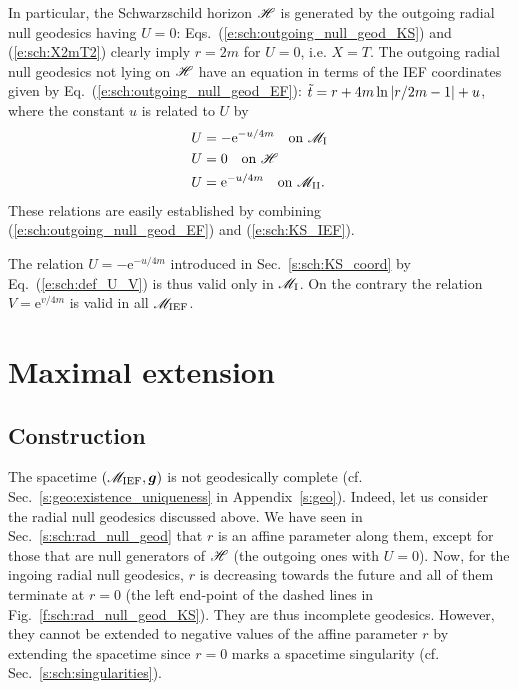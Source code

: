 In particular, the Schwarzschild horizon $\mathscr{H}$ is generated by the
outgoing radial null geodesics having $U=0$:
Eqs.~(\ref{e:sch:outgoing_null_geod_KS}) and (\ref{e:sch:X2mT2})
clearly imply $r=2m$ for $U=0$, i.e. $X=T$.
 The outgoing radial null geodesics not lying on $\mathscr{H}$ have an equation
in terms of the IEF coordinates given by
Eq.~(\ref{e:sch:outgoing_null_geod_EF}):
${\tilde t} = r + 4 m \ln \left|r/2m- 1 \right| + u$,
where the constant $u$ is related to $U$ by
\begin{subequations}
\begin{align}
 & U = - \mathrm{e}^{-u/4m} \quad \mbox{on}\ \mathscr{M}_{\rm I} \\
 & U = 0 \quad \mbox{on}\ \mathscr{H} \\
 & U =  \mathrm{e}^{-u/4m} \quad \mbox{on}\ \mathscr{M}_{\rm II} .
\end{align}
\end{subequations}
These relations are easily established by combining
(\ref{e:sch:outgoing_null_geod_EF}) and (\ref{e:sch:KS_IEF}).


\begin{remark}
The relation $U = - \mathrm{e}^{-u/4m}$ introduced in Sec.~\ref{s:sch:KS_coord}
by Eq.~(\ref{e:sch:def_U_V}) is thus valid only in $\mathscr{M}_{\rm I}$. On the
contrary the relation $V = \mathrm{e}^{v/4m}$ is valid in all $\mathscr{M}_{\rm IEF}$.
\end{remark}

\section{Maximal extension} \label{s:sch:max_extens}

\subsection{Construction} \label{s:sch:max_extens_constr}

The spacetime $(\mathscr{M}_{\rm IEF}, \bm{g})$ is not geodesically complete (cf. Sec.~\ref{s:geo:existence_uniqueness} in Appendix~\ref{s:geo}).
Indeed, let us consider the radial null geodesics discussed above.
We have seen in Sec.~\ref{s:sch:rad_null_geod} that $r$ is an affine parameter
along them, except for those that are null generators of $\mathscr{H}$
(the outgoing ones with $U=0$).
Now, for the ingoing radial null geodesics, $r$ is decreasing towards the
future and all of them terminate at $r=0$ (the left end-point of the dashed
lines in Fig.~\ref{f:sch:rad_null_geod_KS}).
They are thus incomplete geodesics. However, they cannot be extended to
negative values of the affine parameter $r$ by extending the spacetime
since $r=0$ marks a spacetime singularity (cf. Sec.~\ref{s:sch:singularities}).

